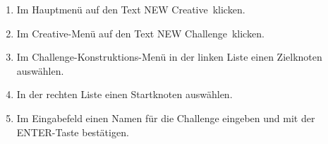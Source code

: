 \begin{description}
\begin{enumerate}
		\item Im Hauptmenü auf den Text \glqq NEW Creative\grqq~klicken.
		\item Im Creative-Menü auf den Text \glqq NEW Challenge\grqq~klicken.
		\item Im Challenge-Konstruktions-Menü in der linken Liste einen Zielknoten auswählen.
		\item In der rechten Liste einen Startknoten auswählen.
		\item Im Eingabefeld einen Namen für die Challenge eingeben und mit der \glqq ENTER\grqq-Taste bestätigen.
		~\\
		
	\end{enumerate}


\end{description}









